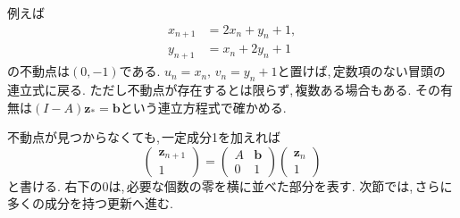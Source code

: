 例えば
\[
 \begin{aligned}
 x_{n+1}&=2x_n+y_n+1,\\
 y_{n+1}&=x_n+2y_n+1
 \end{aligned}
\]
の不動点は$(0,-1)$である.
$u_n=x_n,\,v_n=y_n+1$と置けば,\,定数項のない冒頭の連立式に戻る.
ただし不動点が存在するとは限らず,\,複数ある場合もある.
その有無は$(I-A)\boldsymbol z_*=\boldsymbol b$という連立方程式で確かめる.

不動点が見つからなくても,\,一定成分1を加えれば
\[
 \begin{pmatrix}\boldsymbol z_{n+1}\\1\end{pmatrix}
 =
 \begin{pmatrix}A&\boldsymbol b\\0&1\end{pmatrix}
 \begin{pmatrix}\boldsymbol z_n\\1\end{pmatrix}
\]
と書ける. 右下の0は,\,必要な個数の零を横に並べた部分を表す.
次節では,\,さらに多くの成分を持つ更新へ進む.
